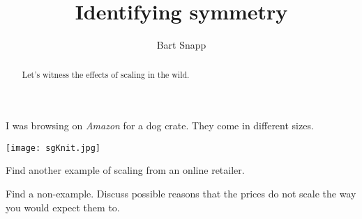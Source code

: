 \documentclass[handout,nooutcomes,noauthor]{ximera}
\title{Identifying symmetry}
\author{Bart Snapp}
\begin{document}
\begin{abstract}
  Let's witness the effects of scaling in the wild.
\end{abstract}
\maketitle


\begin{listOutcomes}
\item 
\end{listOutcomes}
I was browsing on \textit{Amazon} for a dog crate. They come in
different sizes.





\mynewpage





\begin{question}
  \begin{center}
    \texttt{[image: sgKnit.jpg]}
  \end{center}
\end{question}

\mynewpage


\begin{question}
  Find another example of scaling from an online retailer. 
\end{question}

\mynewpage


\begin{question}
  Find a non-example. Discuss possible reasons that the prices do not
  scale the way you would expect them to.
\end{question}
\end{document}
